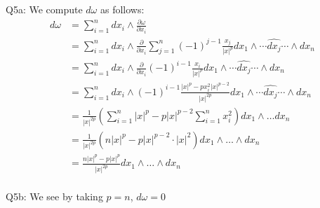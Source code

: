 \documentclass[letterpaper]{article}
\newcommand{\bd}{\partial}
\begin{document}
\noindent Q5a: We compute $d\omega$ as follows: 
\begin{align*}
d\omega & = \sum_{i=1}^n dx_i \wedge \frac{\bd \omega}{\bd x_i}
\\ & = \sum_{i=1}^n dx_i \wedge \frac{\bd}{\bd x_i} \sum_{j=1}^n (-1)^{j-1} \frac{x_j}{|x|^p} dx_1 \wedge \cdots \widehat{dx_j} \cdots \wedge dx_n
\\ & = \sum_{i=1}^n dx_i \wedge \frac{\bd}{\bd x_i} (-1)^{i-1} \frac{x_i}{|x|^p}dx_1 \wedge \cdots \widehat{dx_j} \cdots \wedge dx_n
\\ & = \sum_{i=1}^n dx_i \wedge (-1)^{i-1}\frac{|x|^p - px_i^2|x|^{p-2}}{|x|^{2p}}dx_1 \wedge \cdots \widehat{dx_j} \cdots \wedge dx_n
\\ & = \frac{1}{|x|^{2p}} (\sum_{i=1}^n |x|^p - p |x|^{p-2} \sum_{i=1}^n x_i^2) dx_1 \wedge \dots dx_n 
\\ & = \frac{1}{|x|^{2p}}(n|x|^p-p|x|^{p-2}\cdot |x|^2) dx_1 \wedge \dots \wedge dx_n 
\\ & = \frac{n|x|^p-p|x|^p}{|x|^{2p}} dx_1 \wedge \dots \wedge dx_n 
\end{align*}
\newline \\ Q5b: We see by taking $p=n$, $d\omega =0$
\end{document}
